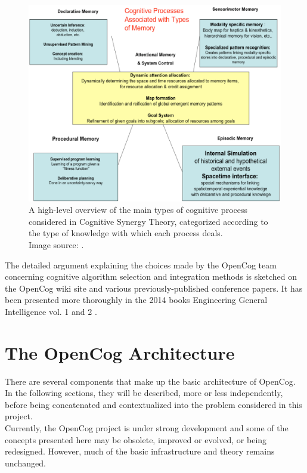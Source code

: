 \begin{figure} [h]
\centering
\includegraphics[width=0.7
\textwidth]{figures/Magistrale/04 - cognitive_processes_and_memory}
\caption[Cognitive Processes.]{A high-level overview of the main types of cognitive process considered in Cognitive Synergy Theory, categorized according to the type of knowledge with which each process deals. \\Image source: \cite{inproceedings_cognitive_synergy}.
\label{fig:cognitive_processes}}
\end{figure} 

The detailed argument explaining the choices made by the OpenCog team concerning cognitive algorithm selection and integration methods is sketched on the OpenCog wiki site\footnotemark{} and various previously-published conference papers. It has been presented more thoroughly in the 2014 books Engineering General Intelligence vol. 1 and 2 \cite{DBLP:series/atlantis/GoertzelPG14, DBLP:series/atlantis/GoertzelPG14a}.

\section{The OpenCog Architecture}\label{sec:opencog_architecture}

There are several components that make up the basic architecture of OpenCog. In the following sections, they will be described, more or less independently, before being concatenated and contextualized into the problem considered in this project. \\
Currently, the OpenCog project is under strong development and some of the concepts presented here may be obsolete, improved or evolved, or being redesigned. However, much of the basic infrastructure and theory remains unchanged.  

